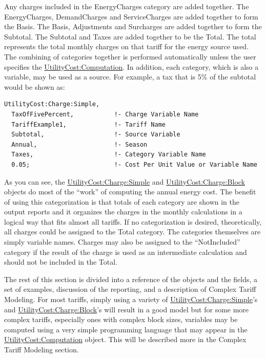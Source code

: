 Any charges included in the EnergyCharges category are added together. The EnergyCharges, DemandCharges and ServiceCharges are added together to form the Basis. The Basis, Adjustments and Surcharges are added together to form the Subtotal. The Subtotal and Taxes are added together to be the Total. The total represents the total monthly charges on that tariff for the energy source used. The combining of categories together is performed automatically unless the user specifies the \hyperref[utilitycostcomputation]{UtilityCost:Computation}. In addition, each category, which is also a variable, may be used as a source. For example, a tax that is 5\% of the subtotal would be shown as:

\begin{lstlisting}
UtilityCost:Charge:Simple,
  TaxOfFivePercent,           !- Charge Variable Name
  TariffExample1,             !- Tariff Name
  Subtotal,                   !- Source Variable
  Annual,                     !- Season
  Taxes,                      !- Category Variable Name
  0.05;                       !- Cost Per Unit Value or Variable Name
\end{lstlisting}

As you can see, the \hyperref[utilitycostchargesimple]{UtilityCost:Charge:Simple} and \hyperref[utilitycostchargeblock]{UtilityCost:Charge:Block} objects do most of the ``work'' of computing the annual energy cost. The benefit of using this categorization is that totals of each category are shown in the output reports and it organizes the charges in the monthly calculations in a logical way that fits almost all tariffs. If no categorization is desired, theoretically, all charges could be assigned to the Total category. The categories themselves are simply variable names. Charges may also be assigned to the ``NotIncluded'' category if the result of the charge is used as an intermediate calculation and should not be included in the Total.

The rest of this section is divided into a reference of the objects and the fields, a set of examples, discussion of the reporting, and a description of Complex Tariff Modeling. For most tariffs, simply using a variety of \hyperref[utilitycostchargesimple]{UtilityCost:Charge:Simple}'s and \hyperref[utilitycostchargeblock]{UtilityCost:Charge:Block}'s will result in a good model but for some more complex tariffs, especially ones with complex block sizes, variables may be computed using a very simple programming language that may appear in the \hyperref[utilitycostcomputation]{UtilityCost:Computation} object. This will be described more in the Complex Tariff Modeling section.
